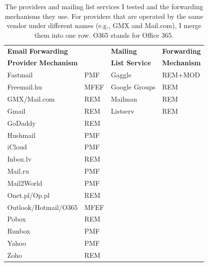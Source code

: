 \begin{table}[t]
  \caption[The Providers and Mailing List Services Tested]{The providers and mailing list services I tested and the forwarding mechanisms they use. For providers that are operated by the same vendor under different names (e.g., GMX and Mail.com), I merge them into one row. O365 stands for Office 365.
    \label{tab:forwarding_mechs_in_the_wild}}
  \centering
  \begin{tabular}{ll|ll}
  \toprule
\multicolumn{2}{l}{\textbf{Email} \hfill \hspace*{0.22in}\textbf{Forwarding}} & \textbf{Mailing} & \textbf{Forwarding} \\
\multicolumn{2}{l}{\textbf{Provider} \hfill \hspace*{0.05in}\textbf{Mechanism}} & \textbf{List Service} & \textbf{Mechanism} \\
  \midrule
  Fastmail        & PMF  & Gaggle & REM+MOD \\
  Freemail.hu     & MFEF & Google Groups & REM\\
  GMX/Mail.com    & REM  & Mailman & REM  \\
  Gmail           & REM  & Listserv & REM \\
  GoDaddy         & REM  & & \\
  Hushmail        & PMF  & & \\
  iCloud          & PMF  & & \\
  Inbox.lv        & REM  & & \\
  Mail.ru         & PMF  & & \\
  Mail2World      & PMF  & & \\
  Onet.pl/Op.pl   & REM  & & \\
  Outlook/Hotmail/O365 & MFEF & & \\
  Pobox           & REM  & & \\
  Runbox          & PMF  & & \\
  Yahoo           & PMF  & & \\
  Zoho            & REM  & & \\
  \bottomrule
  \end{tabular}
  
  \end{table}


